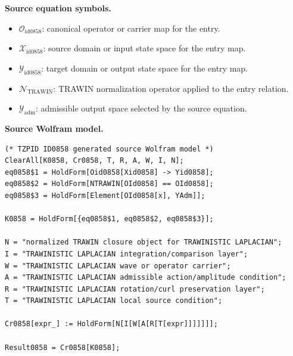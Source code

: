 \begin{minipage}[t]{0.49\linewidth}
\begingroup
\small
\raggedright
\textbf{Source equation symbols.}\par
\begin{itemize}[leftmargin=1.35em,itemsep=1pt,topsep=1pt,parsep=0pt]
    \item $\mathcal{O}_{\mathrm{id0858}}$: canonical operator or carrier map for the entry.
    \item $\mathcal{X}_{\mathrm{id0858}}$: source domain or input state space for the entry map.
    \item $\mathcal{Y}_{\mathrm{id0858}}$: target domain or output state space for the entry map.
    \item $\mathcal{N}_{\mathrm{TRAWIN}}$: TRAWIN normalization operator applied to the entry relation.
    \item $\mathcal{Y}_{\mathrm{adm}}$: admissible output space selected by the source equation.
\end{itemize}
\endgroup
\end{minipage}\hfill
\begin{minipage}[t]{0.47\linewidth}
\begingroup
\scriptsize
\raggedright
\textbf{Source Wolfram model.}\par
\begin{Verbatim}[fontsize=\tiny,breaklines=true,breakanywhere=true]
(* TZPID ID0858 generated source Wolfram model *)
ClearAll[K0858, Cr0858, T, R, A, W, I, N];
eq0858$1 = HoldForm[Oid0858[Xid0858] -> Yid0858];
eq0858$2 = HoldForm[NTRAWIN[OId0858] == OId0858];
eq0858$3 = HoldForm[Element[OId0858[x], YAdm]];

K0858 = HoldForm[{eq0858$1, eq0858$2, eq0858$3}];

N = "normalized TRAWIN closure object for TRAWINISTIC LAPLACIAN";
I = "TRAWINISTIC LAPLACIAN integration/comparison layer";
W = "TRAWINISTIC LAPLACIAN wave or operator carrier";
A = "TRAWINISTIC LAPLACIAN admissible action/amplitude condition";
R = "TRAWINISTIC LAPLACIAN rotation/curl preservation layer";
T = "TRAWINISTIC LAPLACIAN local source condition";

Cr0858[expr_] := HoldForm[N[I[W[A[R[T[expr]]]]]]];

Result0858 = Cr0858[K0858];
\end{Verbatim}
\endgroup
\end{minipage}

